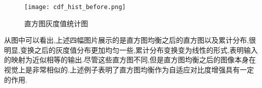 \documentclass[UTF8,a4paper,10pt]{ctexart}
\begin{document}
\begin{flushleft}
\begin{figure}[htbp]
{                \begin{minipage}[t]{0.5\linewidth}
                    \centering
                    \texttt{[image: cdf\_hist\_before.png]}
                \end{minipage}%
            }%
            \quad
            \caption{直方图灰度值统计图}
            \label{fig:fig_gray_hist_cdf_before_after}
        \end{figure}
        \hspace{2em}从图中可以看出,上述四幅图片展示的是直方图均衡之后的直方图以及累计分布,很明显,变换之后的灰度值分布更加均匀一些,累计分布变换变为线性的形式,表明输入的映射为近似相等的输出.尽管这些直方图不同,但是直方图均衡之后的图像本身在视觉上是非常相似的.上述例子表明了直方图均衡作为自适应对比度增强具有一定的作用.

\end{flushleft}
\end{document}
